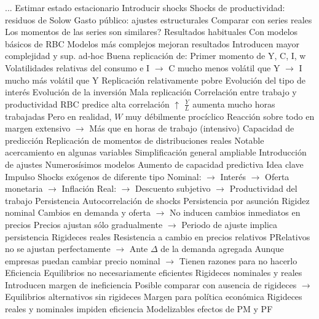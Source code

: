\documentclass{nuevotema}
\begin{document}
\begin{esquemal}
				\4[] ...
				\4[2] Estimar estado estacionario
				\4[3] Introducir shocks
				\4[] Shocks de productividad: residuos de Solow
				\4[] Gasto público: ajustes estructurales
				\4[4] Comparar con series reales
				\4[] Los momentos de las series son similares?
			\3 Resultados habituales
				\4 Con modelos básicos de RBC
				\4[] Modelos más complejos mejoran resultados
				\4[] Introducen mayor complejidad y sup. ad-hoc
				\4 Buena replicación de:
				\4[] Primer momento de Y, C, I, w
				\4[] Volatilidades relativas del consumo e I
				\4[] $\to$ C mucho menos volátil que Y
				\4[] $\to$ I mucho más volátil que Y
				\4 Replicación relativamente pobre
				\4[] Evolución del tipo de interés
				\4[] Evolución de la inversión
				\4 Mala replicación
				\4[] Correlación entre trabajo y productividad
				\4[] RBC predice alta correlación
				\4[] $\uparrow$ $\frac{Y}{L}$ aumenta mucho horas trabajadas
				\4[] Pero en realidad, $W$ muy débilmente procíclico
				\4[] Reacción sobre todo en margen extensivo
				\4[] $\to$ Más que en horas de trabajo (intensivo)
			\3 Capacidad de predicción
				\4 Replicación de momentos de distribuciones reales
				\4[] Notable acercamiento en algunas variables
			\3 Simplificación general ampliable
				\4 Introducción de ajustes
				\4[] Numerosísimos modelos
				\4 Aumento de capacidad predictiva
	\1 
		\2 Idea clave
			\3 Impulso
				\4 Shocks exógenos de diferente tipo
				\4[] Nominal:
				\4[] $\to$ Interés
				\4[] $\to$ Oferta monetaria
				\4[] $\to$ Inflación
				\4[] Real:
				\4[] $\to$ Descuento subjetivo
				\4[] $\to$ Productividad del trabajo
			\3 Persistencia
				\4 Autocorrelación de shocks
				\4[] Persistencia por asunción
				\4 Rigidez nominal
				\4[] Cambios en demanda y oferta
				\4[] $\to$ No inducen cambios inmediatos en precios
				\4[] Precios ajustan sólo gradualmente
				\4[] $\to$ Periodo de ajuste implica persistencia
				\4 Rigideces reales
				\4[] Resistencia a cambio en precios relativos
				\4[] PRelativos no se ajustan perfectamente
				\4[] $\to$ Ante $\Delta$ de la demanda agregada
				\4[] Aunque empresas puedan cambiar precio nominal
				\4[] $\to$ Tienen razones para no hacerlo
			\3 Eficiencia
				\4 Equilibrios no necesariamente eficientes
				\4 Rigideces nominales y reales
				\4[] Introducen margen de ineficiencia
				\4[] Posible comparar con ausencia de rigideces
				\4[] $\to$ Equilibrios alternativos sin rigideces
				\4[$\then$] Margen para política económica
				\4[] Rigideces reales y nominales impiden eficiencia
				\4[] Modelizables efectos de PM y PF

\end{esquemal}
\end{document}
